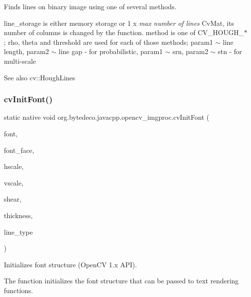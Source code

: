 Finds lines on binary image using one of several methods. 

line\+\_\+storage is either memory storage or 1 x {\itshape max number of lines} Cv\+Mat, its number of columns is changed by the function. method is one of C\+V\+\_\+\+H\+O\+U\+G\+H\+\_\+$\ast$; rho, theta and threshold are used for each of those methods; param1 $\sim$ line length, param2 $\sim$ line gap -\/ for probabilistic, param1 $\sim$ srn, param2 $\sim$ stn -\/ for multi-\/scale \begin{DoxySeeAlso}{See also}
cv\+::\+Hough\+Lines 
\end{DoxySeeAlso}
\mbox{\label{group__imgproc__c_ga7802f35f4ff9683ba622d633d5b17a25}} 
\subsubsection{\texorpdfstring{cv\+Init\+Font()}{cvInitFont()}}
{\footnotesize\ttfamily static native void org.\+bytedeco.\+javacpp.\+opencv\+\_\+imgproc.\+cv\+Init\+Font (\begin{DoxyParamCaption}\item[{Cv\+Font}]{font,  }\item[{int}]{font\+\_\+face,  }\item[{double}]{hscale,  }\item[{double}]{vscale,  }\item[{double}]{shear,  }\item[{int}]{thickness,  }\item[{int}]{line\+\_\+type }\end{DoxyParamCaption})\hspace{0.3cm}{\ttfamily [static]}}



Initializes font structure (Open\+CV 1.\+x A\+PI). 

The function initializes the font structure that can be passed to text rendering functions. 


